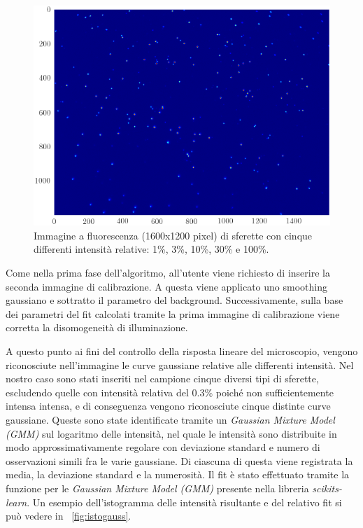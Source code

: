 \begin{figure}[p]
 \centering
 \includegraphics[scale=.64]{img/CAP3piuint.png}
 \caption{\small{Immagine a fluorescenza (1600x1200 pixel) di sferette con cinque differenti intensità relative: 1\%, 3\%, 10\%, 30\% e 100\%.}}
 \label{fig:piuint}
\end{figure}

Come nella prima fase dell'algoritmo, all'utente viene richiesto di inserire la seconda immagine di calibrazione.
A questa viene applicato uno smoothing gaussiano e sottratto il parametro del background. 
Successivamente, sulla base dei parametri del fit calcolati tramite la prima immagine di calibrazione viene corretta la disomogeneità di illuminazione.

A questo punto ai fini del controllo della risposta lineare del microscopio, vengono riconosciute nell'immagine le curve gaussiane relative alle differenti intensità. 
Nel nostro caso sono stati inseriti nel campione cinque diversi tipi di sferette, escludendo quelle con intensità relativa del 0.3\% poiché non sufficientemente intensa intensa, e di conseguenza vengono riconosciute cinque distinte curve gaussiane.
Queste sono state identificate tramite un \textit{Gaussian Mixture Model (GMM)} sul logaritmo delle intensità, nel quale le intensità sono distribuite in modo approssimativamente regolare con deviazione standard e numero di osservazioni simili fra le varie gaussiane. 
Di ciascuna di questa viene registrata la media, la deviazione standard e la numerosità.
Il fit è stato effettuato tramite la funzione per le \textit{Gaussian Mixture Model (GMM)} presente nella libreria \textit{scikits-learn}.
Un esempio dell'istogramma delle intensità risultante e del relativo fit si può vedere in \figurename~\ref{fig:istogauss}.

